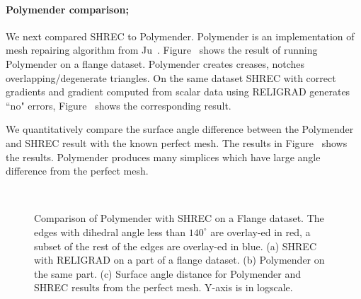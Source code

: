 \paragraph{Polymender comparison;}
We next compared SHREC to Polymender. Polymender is an implementation of mesh repairing algorithm from Ju~\cite{j-rrpm-04}. Figure~\protect{} shows the result of running Polymender on a flange dataset. Polymender creates creases, notches overlapping/degenerate triangles. On the same dataset SHREC with correct gradients and gradient computed from scalar data using RELIGRAD generates ``no" errors, Figure~\protect{} shows the corresponding result. 

We quantitatively compare the surface angle difference between the Polymender and SHREC result with the known perfect mesh. 
The results in Figure~\protect{} shows the results. Polymender produces many simplices which have large angle difference from the perfect mesh. 
\begin{figure}[tb]
	\centering
		\quad
		\\
		\caption{Comparison of Polymender with SHREC on a Flange dataset. The edges with dihedral angle less than $140^\circ$ are overlay-ed in red, a subset of the rest of the edges are overlay-ed in blue. (a) SHREC with RELIGRAD on a part of a flange dataset. (b) Polymender on the same part. (c) Surface angle distance for Polymender and SHREC results from the perfect mesh. Y-axis is in logscale. }	
\end{figure}
